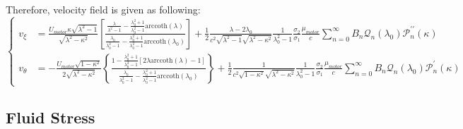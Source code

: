 \documentclass[fontsize=11pt, %
                             paper=a4, %
                             twoside, %
                             captions=tableheading,
                             index=totoc,
                             hyperref]{labbook}
\begin{document}
Therefore, velocity field is given as following:
\begin{equation}
\left\{
\begin{aligned}
v_\xi&=\frac{U_{motor}\kappa\sqrt{\lambda^2-1}}{\sqrt{\lambda^2-\kappa^2}}\left[\frac{\frac{\lambda}{\lambda^2-1}-\frac{\lambda_0^2+1}{\lambda_0^2-1}\mathrm{arccoth}(\lambda)}{\frac{\lambda_0}{\lambda_0^2-1}-\frac{\lambda_0^2+1}{\lambda_0^2-1}\mathrm{arccoth}(\lambda_0)}\right]+\frac{1}{2}\frac{\lambda-2\lambda_0}{c^2\sqrt{\lambda^2-1}\sqrt{\lambda^2-\kappa^2}}\frac{1}{\lambda_0^2-1}\frac{\sigma_2}{\sigma_1}\frac{\mu_{motor}}{c}\sum_{n=0}^\infty B_n\mathscr{Q}_n(\lambda_0)\mathscr{P}_n^{\prime\prime}(\kappa)\\
v_\theta&=-\frac{U_{motor}\sqrt{1-\kappa^2}}{2\sqrt{\lambda^2-\kappa^2}}\left\{\frac{1-\frac{\lambda_0^2+1}{\lambda_0^2-1}\left[2\lambda\mathrm{arccoth}(\lambda)-1\right]}{\frac{\lambda_0}{\lambda_0^2-1}-\frac{\lambda_0^2+1}{\lambda_0^2-1}\mathrm{arccoth}(\lambda_0)}\right\}+\frac{1}{2}\frac{1}{c^2\sqrt{1-\kappa^2}\sqrt{\lambda^2-\kappa^2}}\frac{1}{\lambda_0^2-1}\frac{\sigma_2}{\sigma_1}\frac{\mu_{motor}}{c}\sum_{n=0}^\infty B_n \mathscr{Q}_n(\lambda_0)\mathscr{P}_n^\prime(\kappa)
\end{aligned}
\right.
\end{equation}
\subsection{Fluid Stress}
\end{document}
